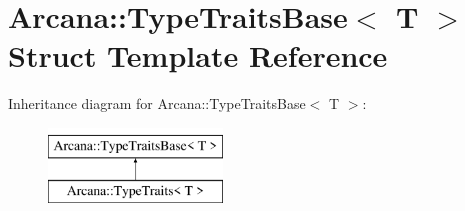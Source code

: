 \hypertarget{struct_arcana_1_1_type_traits_base}{}\section{Arcana\+:\+:Type\+Traits\+Base$<$ T $>$ Struct Template Reference}
\label{struct_arcana_1_1_type_traits_base}
Inheritance diagram for Arcana\+:\+:Type\+Traits\+Base$<$ T $>$\+:\begin{figure}[H]
\begin{center}
\leavevmode
\includegraphics[height=2.000000cm]{struct_arcana_1_1_type_traits_base}
\end{center}
\end{figure}
